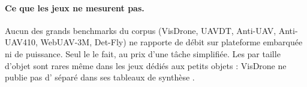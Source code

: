 \paragraph{Ce que les jeux ne mesurent pas.} Aucun des grands benchmarks du corpus
(VisDrone, UAVDT, Anti-UAV, Anti-UAV410, WebUAV-3M, Det-Fly) ne rapporte de débit sur
plateforme embarquée ni de puissance. Seul le  le fait, au prix d'une tâche
simplifiée. Les  par taille d'objet sont rares même dans les jeux dédiés aux petits
objets : VisDrone ne publie pas d' séparé dans ses tableaux de synthèse
\citep[§4]{arxiv-2001.06303-detection-tracking-meet-drones-challenge}.
